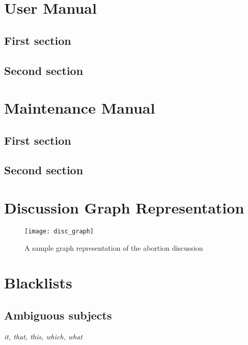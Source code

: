 \begin{appendices}
    \makeatletter
    \makeatother

    \chapter{User Manual}
      \section{First section}
      \section{Second section}

    \chapter{Maintenance Manual\label{app:maintain}}
      \section{First section}
      \section{Second section}

    \chapter{Discussion Graph Representation\label{app:disc_graph}}
      \begin{figure}[h]
        \centering
        \texttt{[image: disc\_graph]}
        \caption{A sample graph representation of the abortion discussion}
      \end{figure}

    \chapter{Blacklists\label{app:blacklists}}
      \section{Ambiguous subjects}
        \textit{it, that, this, which, what}


\end{appendices}
